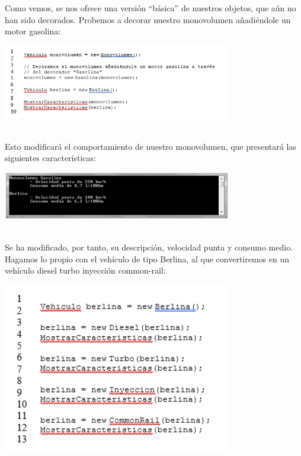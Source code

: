 \begin{flushleft}
Como vemos, se nos ofrece una versión “básica” de nuestros objetos, que aún no han sido decorados. Probemos a decorar nuestro monovolumen añadiéndole un motor gasolina:
\textbf{}\\ 
\begin{center}
	\includegraphics[width=10cm]{./Imagenes/decorator16} 
	\end{center}
\textbf{}\\ 
Esto modificará el comportamiento de nuestro monovolumen, que presentará las siguientes características:
\textbf{}\\ 
\begin{center}
	\includegraphics[width=10cm]{./Imagenes/decorator17} 
	\end{center}
\textbf{}\\ 
Se ha modificado, por tanto, su descripción, velocidad punta y consumo medio. Hagamos lo propio con el vehículo de tipo Berlina, al que convertiremos en un vehículo diesel turbo inyección common-rail:
\textbf{}\\ 
\begin{center}
	\includegraphics[width=10cm]{./Imagenes/decorator18} 
	\end{center}
\textbf{}\\ 

\end{flushleft}
